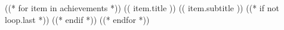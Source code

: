 
((* for item in achievements *))
  \cvachievement
    {}
    {(( item.title ))}
    {(( item.subtitle ))}
  ((* if not loop.last *))
    \dividerbig
  ((* endif *))
((* endfor *))
